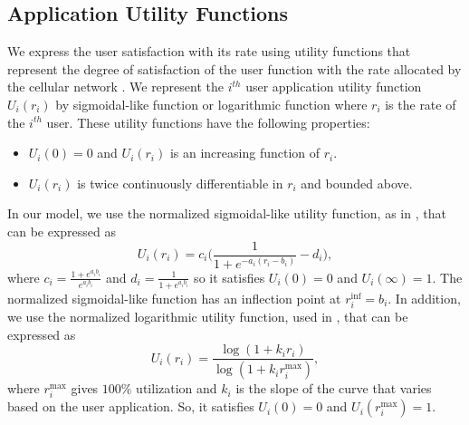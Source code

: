 \documentclass[journal]{IEEEtran} 				\IEEEoverridecommandlockouts 						\usepackage{amsmath,amssymb}
\begin{document}
\subsection{Application Utility Functions}\label{sec:utility functions}
We express the user satisfaction with its rate using utility functions that represent the degree of satisfaction of the user function with the rate allocated by the cellular network \cite{DL_PowerAllocation,Fundamental,Utility-proportional,Ahmed_Utility2}. We represent the $i^{th}$ user application utility function $U_i(r_i)$ by sigmoidal-like function or logarithmic function where $r_i$ is the rate of the $i^{th}$ user. These utility functions have the following properties:
\begin{itemize}
\item $U_i(0) = 0$ and $U_i(r_i)$ is an increasing function of $r_i$.
\item $U_i(r_i)$ is twice continuously differentiable in $r_i$ and bounded above.
\end{itemize}

In our model, we use the normalized sigmoidal-like utility function, as in \cite{Ahmed_Utility2}, that can be expressed as
\begin{equation}\label{eqn:sigmoid}
U_i(r_i) = c_i\Big(\frac{1}{1+e^{-a_i(r_i-b_i)}}-d_i\Big),
\end{equation}
where $c_i = \frac{1+e^{a_ib_i}}{e^{a_ib_i}}$ and $d_i = \frac{1}{1+e^{a_ib_i}}$ so it satisfies $U_i(0)=0$ and $U_i(\infty)=1$. The normalized sigmoidal-like function has an inflection point at $r_i^{\text{inf}}=b_i$. In addition, we use the normalized logarithmic utility function, used in \cite{Ahmed_Utility1}, that can be expressed as
\begin{equation}\label{eqn:log}
U_i(r_i) = \frac{\log(1+k_ir_i)}{\log(1+k_ir_i^{\text{max}})},
\end{equation}
where $r_i^{\text{max}}$ gives $100\%$ utilization and $k_i$ is the slope of the curve that varies based on the user application. So, it satisfies $U_i(0)=0$ and $U_i(r_i^{\text{max}})=1$.
\end{document}
